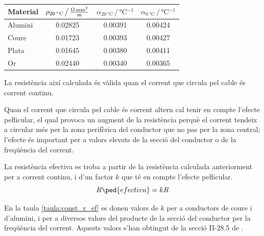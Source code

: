 \begin{center}
   \label{taula:param-elc}
   \begin{tabular}{lccc}
   \toprule[1pt]
   Material & $\rho_{\qty{20}{\degreeCelsius}} \,\big/\, \unit[per-mode = fraction]{\ohm\milli\metre\squared\per\metre}$ & $\alpha_{\qty{20}{\degreeCelsius}} \,\big/\, \unit{\degreeCelsius^{-1}}$ &
   $\alpha_{\qty{0}{\degreeCelsius}} \,\big/\, \unit{\degreeCelsius^{-1}}$
   \\
   \midrule
      Alumini & \num{0,02825} & \num{0,00391} & \num{0,00424} \\
      Coure   & \num{0,01723} & \num{0,00393} & \num{0,00427} \\
      Plata   & \num{0,01645} & \num{0,00380} & \num{0,00411} \\
      Or      & \num{0.02440} & \num{0.00340} & \num{0,00365} \\
   \bottomrule[1pt]
   \end{tabular}
\end{center}

La resistència així calculada és vàlida quan el corrent que circula
pel cable és corrent continu.

Quan el corrent que circula pel cable és
corrent altern cal tenir en compte l'efecte peŀlicular, el qual
 provoca un augment de la resistència  perquè el corrent
tendeix a circular més per la zona perifèrica del conductor que no pas per
la zona central; l'efecte és important per a valors elevats de la
secció del conductor o de la freqüència del corrent.

La resistència efectiva es troba a
partir de la resistència calculada anteriorment per a corrent
continu, i d'un factor $k$ que té en compte l'efecte peŀlicular.
\begin{equation}
   R\ped{efectiva} = k R
\end{equation}

En la taula \vref{taula:const_r_ef} es donen valors de $k$ per a conductors de coure i d'alumini, i per a diversos valors del producte de la secció del conductor per la freqüència del corrent. Aquests valors s'han obtingut de la  secció II-28.5 de \cite{RASa}.

